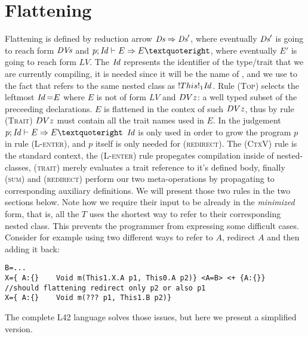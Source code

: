 \section{Flattening}

Flattening is defined by reduction arrow $\textit{Ds} \Rightarrow \textit{Ds}'$, where eventually $\textit{Ds}'$ is going to reach form $\textit{DVs}$  and $p; \Id \vdash E \Rightarrow E’$, where eventually $E'$ is going to reach form $LV$. The $\mathit{Id}$ represents the identifier of the type/trait that we are currently compiling, it is needed since it will be the name of , and we use to the fact that refers to the same nested class as $\This1{\Id}$.
Rule \textsc{(Top)}  selects the leftmost $\Id\eq{E}$
where $E$ is not of form $LV$ and $\\DVz$: a 
well typed subset of the preceeding declarations. 
$E$ is flattened in the contex of such $\\DVz$, thus
by rule \textsc{(Trait)} $\\DVz$ must contain all the trait names used in $E$.
In the judgement $p; \Id \vdash E \Rightarrow E’$
$\mathit{Id}$ is only used in order to grow the program $p$ in rule 
\textsc{(L-enter)}, and $p$ itself is only needed for 
\textsc{(redirect)}.
The \textsc{(CtxV)} rule is the standard context, the \textsc{(L-enter)} rule propegates compilation inside of nested-classes, \textsc{(trait)} merely evaluates a trait reference to it’s defined body,
finally \textsc{(sum)} and \textsc{(redirect)} perform our two meta-operations by propagating to 
corresponding auxiliary definitions. We will present those two rules in the two sections below.
Note how we require their input to be already in the \emph{minimized}
form, that is, all the $T$ uses the shortest way to refer to their corresponding nested class. 
This prevents the programmer from expressing some difficult cases. Consider for example using two different ways to refer to $A$, redirect $A$ and then adding it back:
\begin{lstlisting}
B=...
X={ A:{}    Void m(This1.X.A p1, This0.A p2)} <A=B> <+ {A:{}}
//should flattening redirect only p2 or also p1
X={ A:{}    Void m(??? p1, This1.B p2)}
\end{lstlisting}
The complete L42 language solves those issues, but here we present a simplified version.
